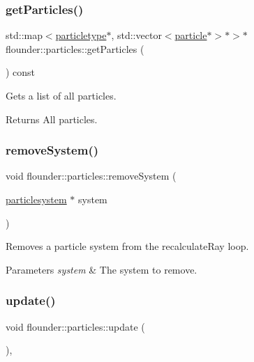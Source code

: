 \subsubsection{\texorpdfstring{get\+Particles()}{getParticles()}}
{\footnotesize\ttfamily std\+::map$<$\hyperlink{classflounder_1_1particletype}{particletype}$\ast$, std\+::vector$<$\hyperlink{classflounder_1_1particle}{particle}$\ast$$>$$\ast$$>$$\ast$ flounder\+::particles\+::get\+Particles (\begin{DoxyParamCaption}{ }\end{DoxyParamCaption}) const\hspace{0.3cm}{\ttfamily [inline]}}



Gets a list of all particles. 

\begin{DoxyReturn}{Returns}
All particles. 
\end{DoxyReturn}
\mbox{\label{classflounder_1_1particles_a33af75a6466ece3ab1b661bcdffae201}} 
\subsubsection{\texorpdfstring{remove\+System()}{removeSystem()}}
{\footnotesize\ttfamily void flounder\+::particles\+::remove\+System (\begin{DoxyParamCaption}\item[{\hyperlink{classflounder_1_1particlesystem}{particlesystem} $\ast$}]{system }\end{DoxyParamCaption})}



Removes a particle system from the recalculate\+Ray loop. 


\begin{DoxyParams}{Parameters}
{\em system} & The system to remove. \\
\hline
\end{DoxyParams}
\mbox{\label{classflounder_1_1particles_a12f1dd9883cc49987f6ff0ca3105bdb6}} 
\subsubsection{\texorpdfstring{update()}{update()}}
{\footnotesize\ttfamily void flounder\+::particles\+::update (\begin{DoxyParamCaption}{ }\end{DoxyParamCaption})\hspace{0.3cm}{\ttfamily [override]}, {\ttfamily [virtual]}}



